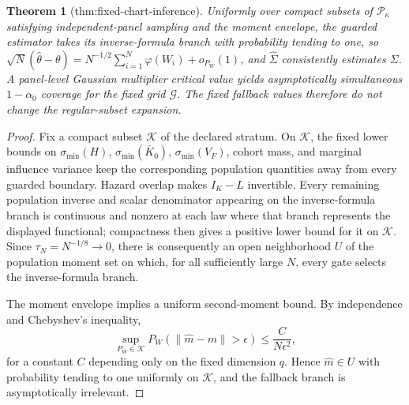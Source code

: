 \documentclass{article}
\newtheorem{theorem}{Theorem}
\begin{document}
\begin{theorem}[thm:fixed-chart-inference]\label{thm:fixed-chart-inference}
Uniformly over compact subsets of \(\mathcal P_{\kappa}\) satisfying independent-panel sampling and the moment envelope, the guarded estimator takes its inverse-formula branch with probability tending to one, so \(\sqrt N(\widehat\theta-\theta)=N^{-1/2}\sum_{i=1}^N\varphi(W_i)+o_{P_W}(1)\), and \(\widehat\Sigma\) consistently estimates \(\Sigma\). A panel-level Gaussian multiplier critical value yields asymptotically simultaneous \(1-\alpha_0\) coverage for the fixed grid \(\mathcal G\). The fixed fallback values therefore do not change the regular-subset expansion.
\end{theorem}
\begin{proof}
Fix a compact subset \(\mathcal K\) of the declared stratum.  On \(\mathcal K\), the fixed lower bounds on \(\sigma_{\min}(H)\), \(\sigma_{\min}(\bar K_0)\), \(\sigma_{\min}(V_F)\), cohort mass, and marginal influence variance keep the corresponding population quantities away from every guarded boundary.  Hazard overlap makes \(I_K-L\) invertible.  Every remaining population inverse and scalar denominator appearing on the inverse-formula branch is continuous and nonzero at each law where that branch represents the displayed functional; compactness then gives a positive lower bound for it on \(\mathcal K\).  Since \(\tau_N=N^{-1/8}\to0\), there is consequently an open neighborhood \(U\) of the population moment set on which, for all sufficiently large \(N\), every gate selects the inverse-formula branch.

The moment envelope implies a uniform second-moment bound.  By independence and Chebyshev's inequality,
\[
 \sup_{P_W\in\mathcal K}P_W\!\left(\|\widehat m-m\|>\epsilon\right)
 \le \frac{C}{N\epsilon^2},                                  \tag{20}
\]
for a constant \(C\) depending only on the fixed dimension \(q\).  Hence \(\widehat m\in U\) with probability tending to one uniformly on \(\mathcal K\), and the fallback branch is asymptotically irrelevant.


\end{proof}
\end{document}

